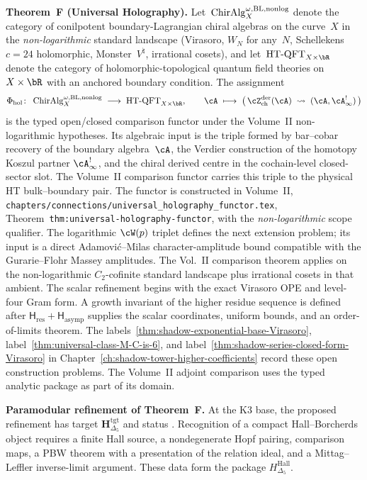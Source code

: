 \noindent\textbf{Theorem~F (Universal Holography).}\enspace
Let~$\operatorname{ChirAlg}^{\omega,\mathrm{BL},\mathrm{nonlog}}_X$ denote the
category of conilpotent boundary-Lagrangian chiral algebras on the
curve~$X$ in the \emph{non-logarithmic} standard landscape
(Virasoro, $W_N$ for any~$N$, Schellekens $c=24$ holomorphic,
Monster~$V^{\natural}$, irrational cosets), and
let~$\HTQFT_{X\times\bR}$ denote the category of
holomorphic-topological quantum field theories
on~$X\times\bR$ with an anchored boundary condition. The assignment
\[
 \Phihol\colon\;
 \ChirAlg^{\omega,\mathrm{BL},\mathrm{nonlog}}_X
 \;\longrightarrow\;
 \HTQFT_{X\times\bR},
 \qquad
 \cA \;\longmapsto\;
 \bigl(\,\cZ^{\mathrm{der}}_{\mathrm{ch}}(\cA)
 \;\rightsquigarrow\;
 (\cA,\cA^{!}_\infty)\,\bigr)
\]
is the typed open/closed comparison functor under the
Volume~II non-logarithmic hypotheses.  Its algebraic input is the
triple formed by bar--cobar recovery of the boundary algebra~\(\cA\),
the Verdier construction of the homotopy Koszul partner
\(\cA^!_\infty\), and the chiral derived centre in the cochain-level
closed-sector slot.  The Volume~II comparison functor carries this
triple to the physical HT bulk--boundary pair.
The functor is constructed in Volume~II,
\texttt{chapters/connections/universal\_holography\_functor.tex},
Theorem~\texttt{thm:universal-holography-functor}, with the
\emph{non-logarithmic} scope qualifier.  The logarithmic
\(\cW(p)\) triplet defines the next extension problem; its input is a
direct Adamovi\'c--Milas character-amplitude bound compatible with the
Gurarie--Flohr Massey amplitudes. The Vol.~II comparison
theorem applies on the non-logarithmic $C_2$-cofinite standard
landscape plus irrational cosets in that ambient.
The scalar refinement begins with the exact Virasoro OPE and
level-four Gram form.  A growth invariant of the higher residue
sequence is defined after
$\mathsf H_{\mathrm{res}}+\mathsf H_{\mathrm{asymp}}$ supplies the
scalar coordinates, uniform bounds, and an order-of-limits theorem.
The labels~\ref{thm:shadow-exponential-base-Virasoro},
label~\ref{thm:universal-class-M-C-is-6}, and
label~\ref{thm:shadow-series-closed-form-Virasoro} in
Chapter~\ref{ch:shadow-tower-higher-coefficients} record these open
construction problems.  The Volume~II adjoint comparison uses the
typed analytic package as part of its domain.

\medskip

\noindent\textbf{Paramodular refinement of Theorem~F.}\enspace
At the K3 base, the proposed refinement has target
\(\mathbf H_{\Delta_5}^{\mathrm{tgt}}\) and status
\ClaimStatusConjectured.  Recognition of a compact
Hall--Borcherds object requires a finite Hall source, a nondegenerate
Hopf pairing, comparison maps, a PBW theorem with a presentation of
the relation ideal, and a Mittag--Leffler inverse-limit argument.
These data form the package $H_{\Delta_5}^{\mathrm{Hall}}$.

